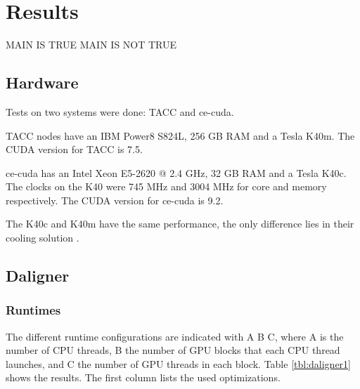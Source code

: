\documentclass[../main/thesis.tex]{subfiles}
\begin{document}
\chapter{Results}
\ifdefined\main
\acresetall
MAIN IS TRUE
\newcommand{\codePath}{../5_results/code/}
\newcommand{\figPath}{../5_results/figures/}
\else
MAIN IS NOT TRUE

\fi

\section{Hardware}
Tests on two systems were done: TACC and ce-cuda.

TACC nodes have an IBM Power8 S824L, 256 GB RAM and a Tesla K40m.
The CUDA version for TACC is 7.5.

ce-cuda has an Intel Xeon E5-2620 @ 2.4 GHz, 32 GB RAM and a Tesla K40c.
The clocks on the K40 were 745 MHz and 3004 MHz for core and memory respectively.
The CUDA version for ce-cuda is 9.2.

The K40c and K40m have the same performance, the only difference lies in their cooling solution \cite{K40m}.

\section{Daligner}
\subsection{Runtimes}
The different runtime configurations are indicated with A B C, where A is the number of CPU threads, B the number of GPU blocks that each CPU thread launches, and C the number of GPU threads in each block.
Table \ref{tbl:daligner1} shows the results.
The first column lists the used optimizations.
\end{document}
